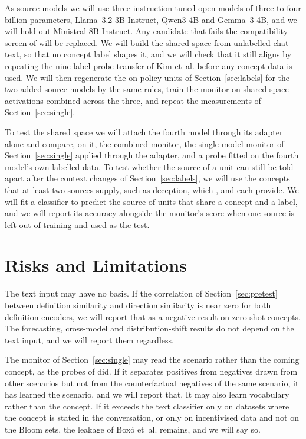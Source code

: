 \documentclass{article}
\newcommand{\etal}{et~al.\spacefactor=1000\relax}
\begin{document}
As source models we will use three instruction-tuned open models of three to four billion parameters, Llama~3.2 3B Instruct, Qwen3 4B and Gemma~3 4B, and we will hold out Ministral 8B Instruct. Any candidate that fails the compatibility screen of \cite{kim2026bus} will be replaced. We will build the shared space from unlabelled chat text, so that no concept label shapes it, and we will check that it still aligns by repeating the nine-label probe transfer of Kim \etal{} before any concept data is used. We will then regenerate the on-policy units of Section~\ref{sec:labels} for the two added source models by the same rules, train the monitor on shared-space activations combined across the three, and repeat the measurements of Section~\ref{sec:single}.

To test the shared space we will attach the fourth model through its adapter alone and compare, on it, the combined monitor, the single-model monitor of Section~\ref{sec:single} applied through the adapter, and a probe fitted on the fourth model's own labelled data. To test whether the source of a unit can still be told apart after the context changes of Section~\ref{sec:labels}, we will use the concepts that at least two sources supply, such as deception, which \cite{goldowskydill2025}, \cite{kirch2025} and \cite{zhou2026} each provide. We will fit a classifier to predict the source of units that share a concept and a label, and we will report its accuracy alongside the monitor's score when one source is left out of training and used as the test.

\section{Risks and Limitations}

The text input may have no basis. If the correlation of Section~\ref{sec:pretest} between definition similarity and direction similarity is near zero for both definition encoders, we will report that as a negative result on zero-shot concepts. The forecasting, cross-model and distribution-shift results do not depend on the text input, and we will report them regardless.

The monitor of Section~\ref{sec:single} may read the scenario rather than the coming concept, as the probes of \cite{fomin2026} did. If it separates positives from negatives drawn from other scenarios but not from the counterfactual negatives of the same scenario, it has learned the scenario, and we will report that. It may also learn vocabulary rather than the concept. If it exceeds the text classifier only on datasets where the concept is stated in the conversation, or only on incentivised data and not on the Bloom sets, the leakage of Box\'o \etal{} remains, and we will say so.
\end{document}
